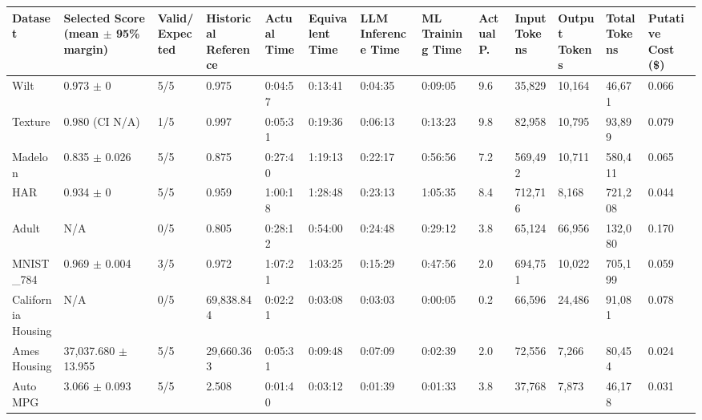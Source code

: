 \begin{tabular}{lllllllllllll}
\hline
Dataset & Selected Score (mean \ensuremath{\pm} 95\% margin) & Valid/Expected & Historical Reference & Actual Time & Equivalent Time & LLM Inference Time & ML Training Time & Actual P. & Input Tokens & Output Tokens & Total Tokens & Putative Cost (\$) \\
\hline
Wilt & 0.973 \ensuremath{\pm} 0 & 5/5 & 0.975 & 0:04:57 & 0:13:41 & 0:04:35 & 0:09:05 & 9.6 & 35,829 & 10,164 & 46,671 & 0.066 \\
Texture & 0.980 (CI N/A) & 1/5 & 0.997 & 0:05:31 & 0:19:36 & 0:06:13 & 0:13:23 & 9.8 & 82,958 & 10,795 & 93,899 & 0.079 \\
Madelon & 0.835 \ensuremath{\pm} 0.026 & 5/5 & 0.875 & 0:27:40 & 1:19:13 & 0:22:17 & 0:56:56 & 7.2 & 569,492 & 10,711 & 580,411 & 0.065 \\
HAR & 0.934 \ensuremath{\pm} 0 & 5/5 & 0.959 & 1:00:18 & 1:28:48 & 0:23:13 & 1:05:35 & 8.4 & 712,716 & 8,168 & 721,208 & 0.044 \\
Adult & N/A & 0/5 & 0.805 & 0:28:12 & 0:54:00 & 0:24:48 & 0:29:12 & 3.8 & 65,124 & 66,956 & 132,080 & 0.170 \\
MNIST\_784 & 0.969 \ensuremath{\pm} 0.004 & 3/5 & 0.972 & 1:07:21 & 1:03:25 & 0:15:29 & 0:47:56 & 2.0 & 694,751 & 10,022 & 705,199 & 0.059 \\
California Housing & N/A & 0/5 & 69,838.844 & 0:02:21 & 0:03:08 & 0:03:03 & 0:00:05 & 0.2 & 66,596 & 24,486 & 91,081 & 0.078 \\
Ames Housing & 37,037.680 \ensuremath{\pm} 13.955 & 5/5 & 29,660.363 & 0:05:31 & 0:09:48 & 0:07:09 & 0:02:39 & 2.0 & 72,556 & 7,266 & 80,454 & 0.024 \\
Auto MPG & 3.066 \ensuremath{\pm} 0.093 & 5/5 & 2.508 & 0:01:40 & 0:03:12 & 0:01:39 & 0:01:33 & 3.8 & 37,768 & 7,873 & 46,178 & 0.031 \\
\hline
\end{tabular}
